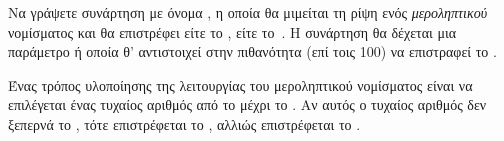 \documentclass[a4paper,11pt,oneside]{book}
\begin{document}
\begin{exercise}
Να γράψετε συνάρτηση με όνομα , η οποία θα μιμείται τη ρίψη ενός \emph{μεροληπτικού} νομίσματος και θα επιστρέφει είτε το , είτε το~. Η συνάρτηση θα δέχεται μια παράμετρο  ή οποία θ' αντιστοιχεί στην πιθανότητα (επί τοις 100) να επιστραφεί το .

\begin{note}
Ένας τρόπος υλοποίησης της λειτουργίας του μεροληπτικού νομίσματος είναι να επιλέγεται ένας τυχαίος αριθμός από το  μέχρι το . Αν αυτός ο τυχαίος αριθμός δεν ξεπερνά το , τότε επιστρέφεται το , αλλιώς επιστρέφεται το .
\end{note}


\end{exercise}
\end{document}
